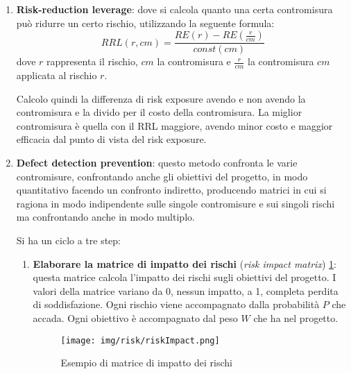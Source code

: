 \begin{enumerate}
    \item \textbf{Risk-reduction leverage}: dove si calcola quanto una certa
          contromisura può ridurre un certo rischio, utilizzando la seguente
          formula:
          \begin{equation}
              RRL(r, cm) = \frac{RE(r) - RE(\frac{r}{cm})}{const(cm)}
          \end{equation}
          dove $r$ rappresenta il rischio, $cm$ la contromisura e $\frac{r}{cm}$
          la contromisura $cm$ applicata al rischio $r$.

          Calcolo quindi la differenza di risk exposure avendo e non avendo la
          contromisura e la divido per il costo della contromisura. La miglior
          contromisura è quella con il RRL maggiore, avendo minor costo e maggior
          efficacia dal punto di vista del risk exposure.
    \item \textbf{Defect detection prevention}: questo metodo confronta le varie
          contromisure, confrontando anche gli obiettivi del progetto, in modo
          quantitativo facendo un confronto indiretto, producendo matrici in cui
          si ragiona in modo indipendente sulle singole contromisure e sui singoli
          rischi ma confrontando anche in modo multiplo.

          Si ha un ciclo a tre step:
          \begin{enumerate}
              \item \textbf{Elaborare la matrice di impatto dei rischi} (\textit{risk
                        impact matrix}) \ref{fig:impact-matrix}: questa matrice
                    calcola l'impatto dei rischi sugli obiettivi del progetto.
                    I valori della matrice variano da 0, nessun impatto, a 1,
                    completa perdita di soddisfazione. Ogni rischio viene
                    accompagnato dalla probabilità $P$ che accada. Ogni obiettivo
                    è accompagnato dal peso $W$ che ha nel progetto.
                    \begin{figure}[!ht]
                        \centering
                        \texttt{[image: img/risk/riskImpact.png]}
                        \caption{Esempio di matrice di impatto dei rischi}
                        \label{fig:impact-matrix}
                    \end{figure}


\end{enumerate}
\end{enumerate}
